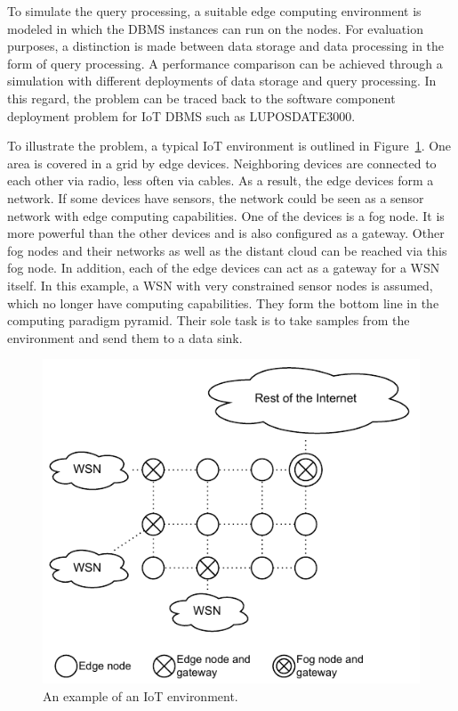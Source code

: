 \documentclass[english,version-2019-11]{uzl-thesis}
\begin{document}
To simulate the query processing, a suitable edge computing environment is modeled in which the DBMS instances can run on the nodes. For evaluation purposes, a distinction is made between data storage and data processing in the form of query processing. A performance comparison can be achieved through a simulation with different deployments of data storage and query processing. In this regard, the problem can be traced back to the software component deployment problem for IoT DBMS such as LUPOSDATE3000.

To illustrate the problem, a typical IoT environment is outlined in Figure~\ref{problemStatementGeneral}. One area is covered in a grid by edge devices. Neighboring devices are connected to each other via radio, less often via cables. As a result, the edge devices form a network. If some devices have sensors, the network could be seen as a sensor network with edge computing capabilities.
One of the devices is a fog node. It is more powerful than the other devices and is also configured as a gateway. Other fog nodes and their networks as well as the distant cloud can be reached via this fog node. In addition, each of the edge devices can act as a gateway for a WSN itself.
In this example, a WSN with very constrained sensor nodes is assumed, which no longer have computing capabilities. They form the bottom line in the computing paradigm pyramid. Their sole task is to take samples from the environment and send them to a data sink.
\begin{figure}[htpb]
  \centering
  \includegraphics{problemStatementGeneral.pdf}
  \caption{An example of an IoT environment.}
  \label{problemStatementGeneral}
\end{figure}
\end{document}
